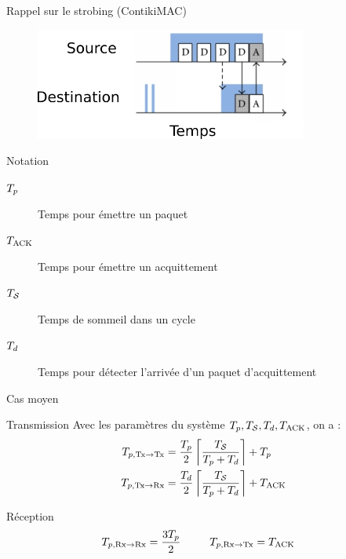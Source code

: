 \begin{frame}{Rappel sur le strobing (ContikiMAC)}
  \begin{figure}
    \centering
    \includegraphics[width=0.8\textwidth]{figures/contikimac.png}
  \end{figure}
  \begin{block}{Notation}
    \begin{description}
      \item[$T_{p}$] Temps pour émettre un paquet
      \item[$T_{\textrm{ACK}}$] Temps pour émettre un acquittement
      \item[$T_{\mathcal{S}}$] Temps de sommeil dans un cycle
      \item[$T_{d}$] Temps pour détecter l'arrivée d'un paquet d'acquittement
    \end{description}
  \end{block}
\end{frame}


\begin{frame}{Cas moyen}

    \begin{alertblock}{Transmission}
      Avec les paramètres du système $T_{p}, T_{\mathcal{S}}, T_{d}, T_{\textrm{ACK}}$, on a :
    \begin{align*}
      T_{p, \textrm{Tx} \to \textrm{Tx}} &=  \frac{T_{p}}{2} \left\lceil \frac{T_{\mathcal{S}}}{T_{p} + T_{d}}\right\rceil + T_{p} \\
      T_{p, \textrm{Tx} \to \textrm{Rx}} &= \frac{T_{d}}{2} \left \lceil \dfrac{T_{\mathcal{S}}}{T_{p} + T_{d}} \right \rceil + T_{\textrm{ACK}}
    \end{align*}
  \end{alertblock}

  \begin{alertblock}{Réception}
    \begin{align*}
      T_{p, \textrm{Rx} \to \textrm{Rx}} &= \frac{3 T_{p}}{2} \mbox{\phantom{xxxxx}} T_{p, \textrm{Rx} \to \textrm{Tx}} = T_{\textrm{ACK}}
    \end{align*}
  \end{alertblock}

\end{frame}


